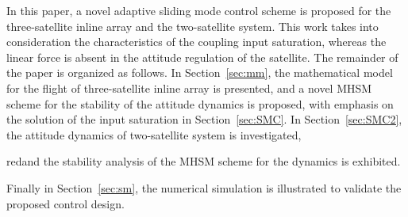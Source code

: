 In this paper, a novel adaptive sliding mode control scheme is proposed for the three-satellite inline array and the two-satellite system. This work takes into consideration the characteristics of the coupling input saturation, whereas the linear force is absent in the attitude regulation of the satellite. The remainder of the paper is organized as follows. In Section~\ref{sec:mm}, the mathematical model for the flight of three-satellite inline array is presented, and a novel MHSM scheme for the stability of the attitude dynamics is proposed, with emphasis on the solution of the input saturation in Section~\ref{sec:SMC}. In Section~\ref{sec:SMC2}, the attitude dynamics of two-satellite system is investigated, \begin{color}{red}and the stability analysis of the MHSM scheme for the dynamics is exhibited.\end{color} Finally in Section~\ref{sec:sm}, the numerical simulation is illustrated to validate the proposed control design.
